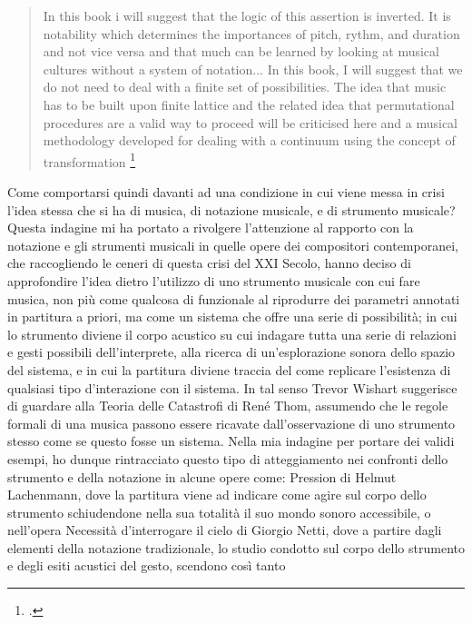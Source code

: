 \begin{quote}
    In this book i will suggest that the logic of this assertion is inverted.
    It is notability which determines the importances of pitch, rythm, and duration and
    not vice versa and that much can be learned by looking at 
    musical cultures without a system of notation... 
    In this book, I will suggest that we do not need to deal with a finite set of
    possibilities. The idea that music has to be built upon  finite lattice and the
    related idea that permutational procedures are a valid way to proceed will
    be criticised here and a musical methodology developed for dealing with a
    continuum using the concept of transformation \footcite{wishart_on_sonic_art}
\end{quote}

Come comportarsi quindi davanti ad una condizione in cui viene messa in crisi l'idea stessa
che si ha di musica, di notazione musicale, e di strumento musicale?\\
Questa indagine mi ha portato a rivolgere l'attenzione al rapporto con la notazione 
e gli strumenti musicali in quelle opere dei compositori contemporanei, 
che raccogliendo le ceneri di questa crisi del XXI Secolo, 
hanno deciso di approfondire l'idea dietro l'utilizzo
di uno strumento musicale con cui fare musica, non più come 
qualcosa di funzionale al riprodurre dei parametri annotati in partitura a priori,
ma come un sistema che offre una serie di possibilità; 
in cui lo strumento diviene il corpo acustico su cui indagare 
tutta una serie di relazioni e gesti possibili dell'interprete, 
alla ricerca di un'esplorazione sonora dello spazio del sistema,
e in cui la partitura diviene traccia del come replicare l'esistenza di 
qualsiasi tipo d'interazione con il sistema.
In tal senso Trevor Wishart suggerisce di guardare alla Teoria delle Catastrofi 
di René Thom, assumendo che le regole formali di una musica passono
essere ricavate dall'osservazione di uno strumento stesso come se questo fosse un sistema.
Nella mia indagine per portare dei validi esempi, ho dunque rintracciato questo tipo di atteggiamento 
nei confronti dello strumento
e della notazione in alcune opere come: Pression di Helmut Lachenmann,
dove la partitura viene ad indicare come agire sul corpo dello strumento
schiudendone nella sua totalità il suo mondo sonoro accessibile,
o nell'opera Necessità d'interrogare il cielo di Giorgio Netti,
dove a partire dagli elementi della notazione tradizionale, lo studio condotto 
sul corpo dello strumento e degli esiti acustici del gesto, scendono così tanto 
